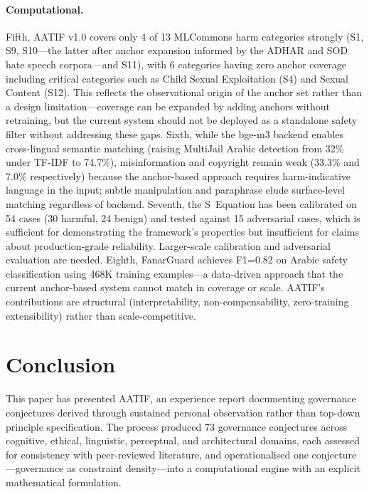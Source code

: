 \documentclass[11pt,a4paper]{article}
\begin{document}
\paragraph{Computational.} Fifth, AATIF v1.0 covers only 4 of 13 MLCommons harm categories strongly (S1, S9, S10---the latter after anchor expansion informed by the ADHAR \citep{adhar2024} and SOD \citep{sod2024} hate speech corpora---and S11), with 6 categories having zero anchor coverage including critical categories such as Child Sexual Exploitation (S4) and Sexual Content (S12). This reflects the observational origin of the anchor set rather than a design limitation---coverage can be expanded by adding anchors without retraining, but the current system should not be deployed as a standalone safety filter without addressing these gaps. Sixth, while the bge-m3 backend enables cross-lingual semantic matching (raising MultiJail Arabic detection from 32\% under TF-IDF to 74.7\%), misinformation and copyright remain weak (33.3\% and 7.0\% respectively) because the anchor-based approach requires harm-indicative language in the input; subtle manipulation and paraphrase elude surface-level matching regardless of backend. Seventh, the S~Equation has been calibrated on 54 cases (30 harmful, 24 benign) and tested against 15 adversarial cases, which is sufficient for demonstrating the framework's properties but insufficient for claims about production-grade reliability. Larger-scale calibration and adversarial evaluation are needed. Eighth, FanarGuard \citep{fanarguard2025} achieves F1=0.82 on Arabic safety classification using 468K training examples---a data-driven approach that the current anchor-based system cannot match in coverage or scale. AATIF's contributions are structural (interpretability, non-compensability, zero-training extensibility) rather than scale-competitive.

\section{Conclusion}

This paper has presented AATIF, an experience report documenting governance conjectures derived through sustained personal observation rather than top-down principle specification. The process produced 73 governance conjectures across cognitive, ethical, linguistic, perceptual, and architectural domains, each assessed for consistency with peer-reviewed literature, and operationalised one conjecture---governance as constraint density---into a computational engine with an explicit mathematical formulation.
\end{document}
